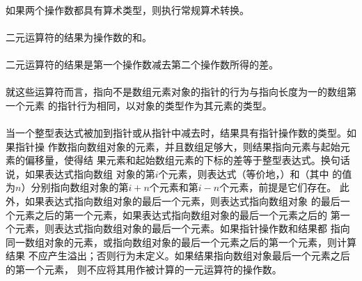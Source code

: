 {\semantic
\paragraph{}
如果两个操作数都具有算术类型，则执行常规算术转换。

\paragraph{}
二元\tm{+}运算符的结果为操作数的和。

\paragraph{}
二元\tm{-}运算符的结果是第一个操作数减去第二个操作数所得的差。

\paragraph{}
就这些运算符而言，指向不是数组元素对象的指针的行为与指向长度为一的数组第一个元素
的指针行为相同，以对象的类型作为其元素的类型。

\paragraph{}
当一个整型表达式被加到指针或从指针中减去时，结果具有指针操作数的类型。如果指针操
作数指向数组对象的元素，并且数组足够大，则结果指向元素与起始元素的偏移量，使得结
果元素和起始数组元素的下标的差等于整型表达式。换句话说，如果表达式指向数组
对象的第$i$个元素，则表达式（等价地，）和（其中
的值为$n$）分别指向数组对象的第$i+n$个元素和第$i-n$个元素，前提是它们存在。
此外，如果表达式指向数组对象的最后一个元素，则表达式指向数组对象
的最后一个元素之后的第一个元素，如果表达式指向数组对象的最后一个元素之后的
第一个元素，则表达式指向数组对象的最后一个元素。如果指针操作数和结果都
指向同一数组对象的元素，或指向数组对象的最后一个元素之后的第一个元素，则计算结果
不应产生溢出；否则行为未定义。如果结果指向数组对象最后一个元素之后的第一个元素，
则不应将其用作被计算的一元\tm{*}运算符的操作数。

}
